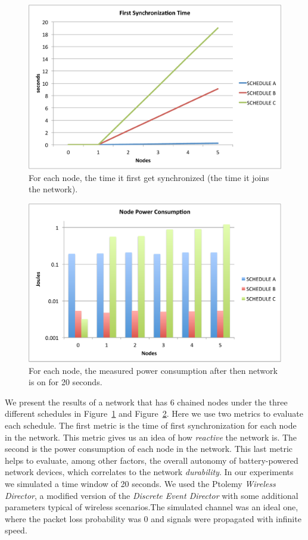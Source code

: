 \begin{figure}[t]
\centering
\includegraphics[width=0.9\columnwidth]{figures/synch_time_sched_big}
\caption{For each node, the time it first get synchronized (the time it joins the network).}
\label{fig:time_sync}
\end{figure}

\begin{figure}[t]
\centering
\includegraphics[width=0.9\columnwidth]{figures/power_cons_big}
\caption{For each node, the measured power consumption after then network is on for 20 seconds.}
\label{fig:power_evaluation}
\end{figure}

We present the results of a network that has 6 chained nodes under the three different schedules in Figure~\ref{fig:time_sync} and Figure~\ref{fig:power_evaluation}. Here we use two metrics to evaluate each schedule. The first metric is the time of first synchronization for each node in the network. This metric gives us an idea of how \emph{reactive} the network is. The second is the power consumption of each node in the network. This last metric helps to evaluate, among other factors, the overall autonomy of battery-powered network devices, which correlates to the network {\em durability}.
In our experiments we simulated a time window of 20 seconds. We used the Ptolemy \emph{Wireless Director}, a modified version of the \emph{Discrete Event Director} with some additional parameters typical of wireless scenarios.The simulated channel was an ideal one, where the packet loss probability was 0 and signals were propagated with infinite speed.

